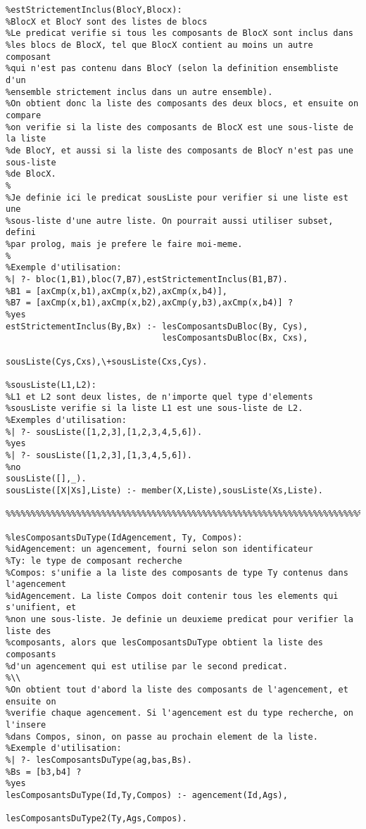 \documentclass[letterpaper,11pt]{letter}
\begin{document}
\begin{Verbatim}[fontseries=b]
%%%%%%%%%%%%%%%%%%%%%%%%%%%%%%%%%%%%%%%%%%%%%%%%%%%%%%%%%%%%%%%%%%%%%%%%%%%%%%%
%estStrictementInclus(BlocY,Blocx):
%BlocX et BlocY sont des listes de blocs
%Le predicat verifie si tous les composants de BlocX sont inclus dans
%les blocs de BlocX, tel que BlocX contient au moins un autre composant
%qui n'est pas contenu dans BlocY (selon la definition ensembliste d'un
%ensemble strictement inclus dans un autre ensemble).
%On obtient donc la liste des composants des deux blocs, et ensuite on compare
%on verifie si la liste des composants de BlocX est une sous-liste de la liste
%de BlocY, et aussi si la liste des composants de BlocY n'est pas une sous-liste
%de BlocX.
%
%Je definie ici le predicat sousListe pour verifier si une liste est une 
%sous-liste d'une autre liste. On pourrait aussi utiliser subset, defini
%par prolog, mais je prefere le faire moi-meme.
%
%Exemple d'utilisation:
%| ?- bloc(1,B1),bloc(7,B7),estStrictementInclus(B1,B7).
%B1 = [axCmp(x,b1),axCmp(x,b2),axCmp(x,b4)],
%B7 = [axCmp(x,b1),axCmp(x,b2),axCmp(y,b3),axCmp(x,b4)] ? 
%yes
estStrictementInclus(By,Bx) :- lesComposantsDuBloc(By, Cys),
                               lesComposantsDuBloc(Bx, Cxs),
                               sousListe(Cys,Cxs),\+sousListe(Cxs,Cys).

%sousListe(L1,L2):
%L1 et L2 sont deux listes, de n'importe quel type d'elements
%sousListe verifie si la liste L1 est une sous-liste de L2.
%Exemples d'utilisation:
%| ?- sousListe([1,2,3],[1,2,3,4,5,6]).
%yes
%| ?- sousListe([1,2,3],[1,3,4,5,6]).
%no
sousListe([],_).
sousListe([X|Xs],Liste) :- member(X,Liste),sousListe(Xs,Liste).

%%%%%%%%%%%%%%%%%%%%%%%%%%%%%%%%%%%%%%%%%%%%%%%%%%%%%%%%%%%%%%%%%%%%%%%%%%%%%%%

%lesComposantsDuType(IdAgencement, Ty, Compos):
%idAgencement: un agencement, fourni selon son identificateur
%Ty: le type de composant recherche
%Compos: s'unifie a la liste des composants de type Ty contenus dans l'agencement
%idAgencement. La liste Compos doit contenir tous les elements qui s'unifient, et
%non une sous-liste. Je definie un deuxieme predicat pour verifier la liste des
%composants, alors que lesComposantsDuType obtient la liste des composants
%d'un agencement qui est utilise par le second predicat.
%\\
%On obtient tout d'abord la liste des composants de l'agencement, et ensuite on
%verifie chaque agencement. Si l'agencement est du type recherche, on l'insere
%dans Compos, sinon, on passe au prochain element de la liste.
%Exemple d'utilisation:
%| ?- lesComposantsDuType(ag,bas,Bs).
%Bs = [b3,b4] ? 
%yes
lesComposantsDuType(Id,Ty,Compos) :- agencement(Id,Ags),
                                     lesComposantsDuType2(Ty,Ags,Compos).


\end{Verbatim}
\end{document}

